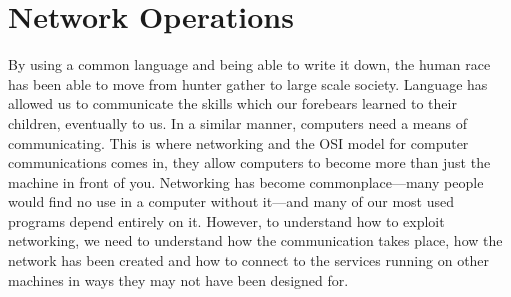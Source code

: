 \documentclass[a4paper,11pt]{report}
\begin{document}
\chapter{Network Operations}
	\label{ch:NetworkOperations}
	By using a common language and being able to write it down, the human race has been able to move from hunter gather to large scale society. 
	Language has allowed us to communicate the skills which our forebears learned to their children, eventually to us. 
	In a similar manner, computers need a means of communicating. 
	This is where networking and the OSI model for computer communications comes in, they allow computers to become more than just the machine in front of you. 
	Networking has become commonplace---many people would find no use in a computer without it---and many of our most used programs depend entirely on it. 
	However, to understand how to exploit networking, we need to understand how the communication takes place, how the network has been created and how to connect to the services running on other machines in ways they may not have been designed for. 
\end{document}
